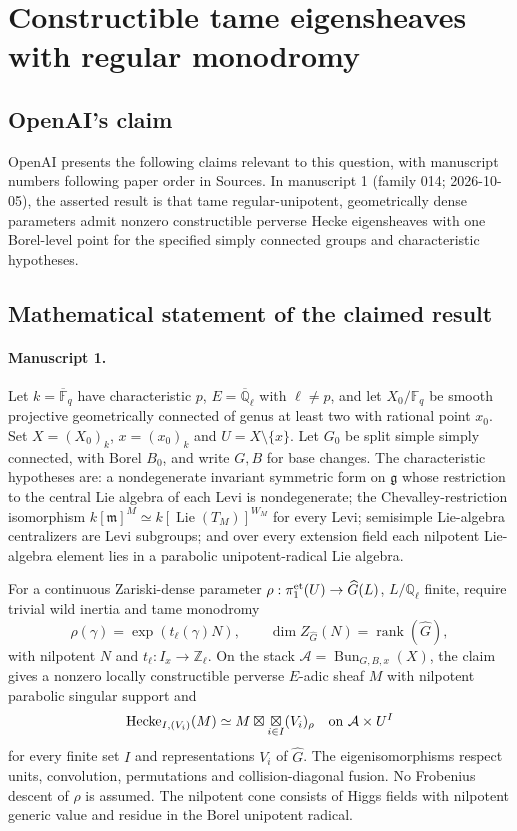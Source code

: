 \documentclass[11pt]{article}
\begin{document}
\section*{Constructible tame eigensheaves with regular monodromy}

\subsection{OpenAI's claim}
OpenAI presents the following claims relevant to this question, with manuscript numbers following paper order in Sources. In manuscript 1 (family 014; 2026-10-05), the asserted result is that tame regular-unipotent, geometrically dense parameters admit nonzero constructible perverse Hecke eigensheaves with one Borel-level point for the specified simply connected groups and characteristic hypotheses.

\subsection{Mathematical statement of the claimed result}
\paragraph{Manuscript 1.}
Let $k=\overline{\mathbb F}_q$ have characteristic $p$, $E=\overline{\mathbb Q}_{\ell}$ with $\ell\ne p$, and let $X_0/\mathbb F_q$ be smooth projective geometrically connected of genus at least two with rational point $x_0$. Set $X=(X_0)_k$, $x=(x_0)_k$ and $U=X\setminus\{x\}$. Let $G_0$ be split simple simply connected, with Borel $B_0$, and write $G,B$ for base changes. The characteristic hypotheses are: a nondegenerate invariant symmetric form on $\mathfrak g$ whose restriction to the central Lie algebra of each Levi is nondegenerate; the Chevalley-restriction isomorphism $k[\mathfrak m]^M\simeq k[\operatorname{Lie}(T_M)]^{W_M}$ for every Levi; semisimple Lie-algebra centralizers are Levi subgroups; and over every extension field each nilpotent Lie-algebra element lies in a parabolic unipotent-radical Lie algebra.

For a continuous Zariski-dense parameter $\rho:\pi_1^{\rm et}(U)\to\widehat G(L)$, $L/\mathbb Q_{\ell}$ finite, require trivial wild inertia and tame monodromy
\[
 \rho(\gamma)=\exp(t_{\ell}(\gamma)N),\qquad
 \dim Z_{\widehat G}(N)=\operatorname{rank}(\widehat G),
\]
with nilpotent $N$ and $t_{\ell}:I_x\to\mathbb Z_{\ell}$. On the stack $\mathcal A=\operatorname{Bun}_{G,B,x}(X)$, the claim gives a nonzero locally constructible perverse $E$-adic sheaf $M$ with nilpotent parabolic singular support and
\[
 \operatorname{Hecke}_{I,(V_i)}(M)\simeq
 M\boxtimes\mathop{\boxtimes}_{i\in I}(V_i)_{\rho}
 \quad\hbox{on }\mathcal A\times U^I
\]
for every finite set $I$ and representations $V_i$ of $\widehat G$. The eigenisomorphisms respect units, convolution, permutations and collision-diagonal fusion. No Frobenius descent of $\rho$ is assumed. The nilpotent cone consists of Higgs fields with nilpotent generic value and residue in the Borel unipotent radical.
\end{document}
